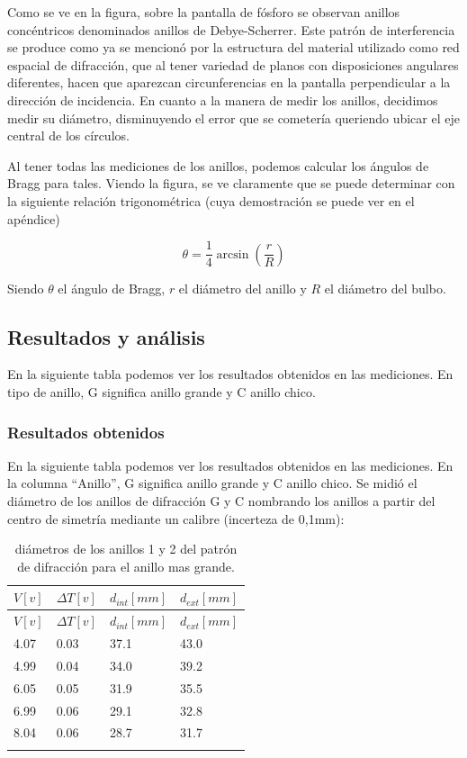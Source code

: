 \documentclass[]{article}
\begin{document}
Como se ve en la figura, sobre la pantalla de fósforo se observan
anillos concéntricos denominados anillos de Debye-Scherrer. Este patrón
de interferencia se produce como ya se mencionó por la estructura del
material utilizado como red espacial de difracción, que al tener
variedad de planos con disposiciones angulares diferentes, hacen que
aparezcan circunferencias en la pantalla perpendicular a la dirección de
incidencia. En cuanto a la manera de medir los anillos, decidimos medir
su diámetro, disminuyendo el error que se cometería queriendo ubicar el
eje central de los círculos.

Al tener todas las mediciones de los anillos, podemos calcular los
ángulos de Bragg para tales. Viendo la figura, se ve claramente que se
puede determinar con la siguiente relación trigonométrica (cuya
demostración se puede ver en el apéndice)

\[\theta = \frac{1}{4} \arcsin\left (\frac{r}{R} \right )\]

Siendo \(\theta\) el ángulo de Bragg, \(r\) el diámetro del anillo y
\(R\) el diámetro del bulbo.

\hypertarget{resultados-y-anuxe1lisis}{%
\subsection{Resultados y análisis}\label{resultados-y-anuxe1lisis}}

En la siguiente tabla podemos ver los resultados obtenidos en las
mediciones. En tipo de anillo, G significa anillo grande y C anillo
chico.

\hypertarget{resultados-obtenidos}{%
\subsubsection{Resultados obtenidos}\label{resultados-obtenidos}}

En la siguiente tabla podemos ver los resultados obtenidos en las
mediciones. En la columna ``Anillo'', G significa anillo grande y C
anillo chico. Se midió el diámetro de los anillos de difracción G y C
nombrando los anillos a partir del centro de simetría mediante un
calibre (incerteza de 0,1mm):

\begin{longtable}[]{@{}llll@{}}
\toprule
\(V[v]\) & \(\Delta T[v]\) & \(d_{int}[mm]\) &
\(d_{ext}[mm]\)\tabularnewline
\midrule
\endfirsthead
\toprule
\(V[v]\) & \(\Delta T[v]\) & \(d_{int}[mm]\) &
\(d_{ext}[mm]\)\tabularnewline
\midrule
\endhead
4.07 & 0.03 & 37.1 & 43.0\tabularnewline
4.99 & 0.04 & 34.0 & 39.2\tabularnewline
6.05 & 0.05 & 31.9 & 35.5\tabularnewline
6.99 & 0.06 & 29.1 & 32.8\tabularnewline
8.04 & 0.06 & 28.7 & 31.7\tabularnewline
\bottomrule
\caption{diámetros de los anillos 1 y 2 del patrón de difracción para el
anillo mas grande.}\tabularnewline
\end{longtable}
\end{document}
